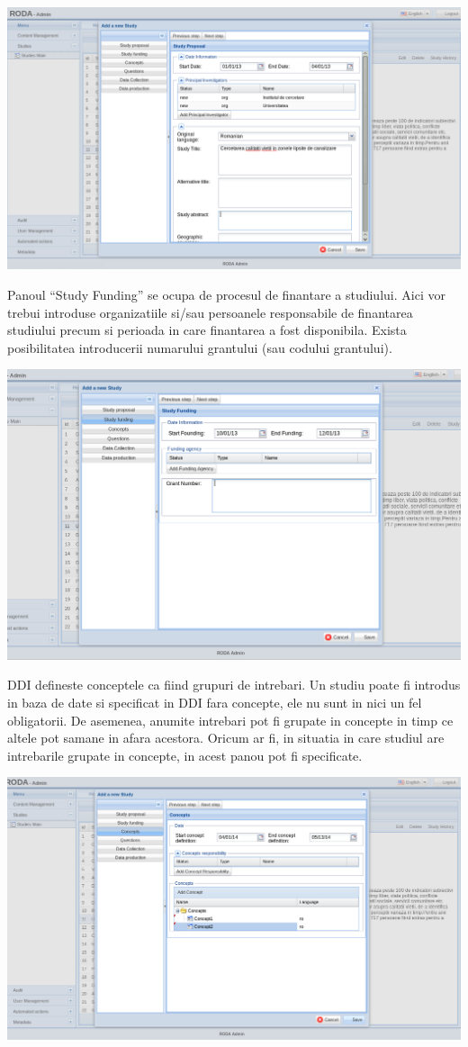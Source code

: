 \includegraphics[width=16cm]{img/ddi-editor-proposal}

Panoul “Study Funding” se ocupa de procesul de finantare a studiului. Aici vor trebui introduse organizatiile si/sau persoanele responsabile de finantarea studiului precum si perioada in care finantarea a fost disponibila. Exista posibilitatea introducerii numarului grantului (sau codului grantului).


\includegraphics[width=16cm]{img/ddi-editor-funding}


DDI defineste conceptele ca fiind grupuri de intrebari. Un studiu poate fi introdus in baza de date si specificat in DDI fara concepte, ele nu sunt in nici un fel obligatorii. De asemenea, anumite intrebari pot fi grupate in concepte in timp ce altele pot samane in afara acestora. Oricum ar fi, in situatia in care studiul are intrebarile grupate in concepte, in acest panou pot fi specificate. 


\includegraphics[width=16cm]{img/ddi-editor-concepts}



